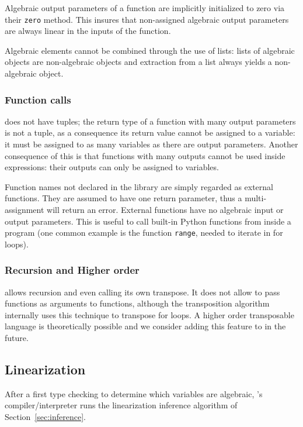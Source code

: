 Algebraic output parameters of a function are implicitly initialized
to zero via their \lstinline+zero+ method. This insures that
non-assigned algebraic output parameters are always linear in the
inputs of the function.

Algebraic elements cannot be combined through the use of lists: lists
of algebraic objects are non-algebraic objects and extraction from a
list always yields a non-algebraic object.


\subsubsection{Function calls}
\tALpy{} does not have tuples; the return type of a function with many
output parameters is not a tuple, as a consequence its return value
cannot be assigned to a variable: it must be assigned to as many
variables as there are output parameters.  Another consequence of this
is that functions with many outputs cannot be used inside expressions:
their outputs can only be assigned to variables.

Function names not declared in the library are simply regarded as
external functions. They are assumed to have one return parameter,
thus a multi-assignment will return an error. External functions have
no algebraic input or output parameters. This is useful to call
built-in Python functions from inside a \tALpy{} program (one common
example is the function \lstinline+range+, needed to iterate in for
loops).

\subsubsection{Recursion and Higher order}
\tALpy{} allows recursion and even calling its own transpose. It does
not allow to pass functions as arguments to functions, although the
transposition algorithm internally uses this technique to transpose
for loops. A higher order transposable language is theoretically
possible and we consider adding this feature to \tALpy{} in the
future.

\subsection{Linearization}
\label{sec:linearization}

After a first type checking to determine which variables are
algebraic, \tALpy{}'s compiler/interpreter runs the linearization
inference algorithm of Section~\ref{sec:inference}.

